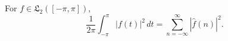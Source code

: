 For $f \in \mathfrak{L}_2([-\pi, \pi])$,
$$\frac{1}{2\pi} \int_{-\pi}^{\pi} |f(t)|^2 \, dt = \sum_{n=-\infty}^{\infty} |\hat{f}(n)|^2.$$
